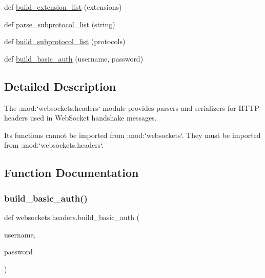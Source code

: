 \begin{DoxyCompactItemize}
\item 
def \hyperlink{namespacewebsockets_1_1headers_a350e170144d586eb8c0869b706e7ed67}{build\+\_\+extension\+\_\+list} (extensions)
\item 
def \hyperlink{namespacewebsockets_1_1headers_adcc756ea3357b56bd6d635c3c77c9676}{parse\+\_\+subprotocol\+\_\+list} (string)
\item 
def \hyperlink{namespacewebsockets_1_1headers_a84f147056906dab05f8abc2421688d76}{build\+\_\+subprotocol\+\_\+list} (protocols)
\item 
def \hyperlink{namespacewebsockets_1_1headers_ab9aa3bf8fc316b741bf137623364723b}{build\+\_\+basic\+\_\+auth} (username, password)
\end{DoxyCompactItemize}


\subsection{Detailed Description}
\begin{DoxyVerb}The :mod:`websockets.headers` module provides parsers and serializers for HTTP
headers used in WebSocket handshake messages.

Its functions cannot be imported from :mod:`websockets`. They must be imported
from :mod:`websockets.headers`.\end{DoxyVerb}
 

\subsection{Function Documentation}
\mbox{\label{namespacewebsockets_1_1headers_ab9aa3bf8fc316b741bf137623364723b}} 
\subsubsection{\texorpdfstring{build\+\_\+basic\+\_\+auth()}{build\_basic\_auth()}}
{\footnotesize\ttfamily def websockets.\+headers.\+build\+\_\+basic\+\_\+auth (\begin{DoxyParamCaption}\item[{}]{username,  }\item[{}]{password }\end{DoxyParamCaption})}

